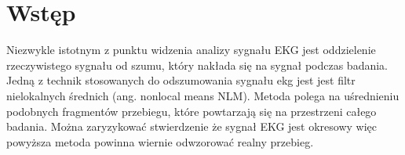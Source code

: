 \section{Wstęp}

Niezwykle istotnym z punktu widzenia analizy sygnału EKG jest oddzielenie rzeczywistego sygnału od szumu, który nakłada się na sygnał podczas badania. Jedną z technik stosowanych do odszumowania sygnału ekg jest jest filtr nielokalnych średnich (ang. nonlocal means NLM). Metoda polega na uśrednieniu podobnych fragmentów przebiegu, które powtarzają się na przestrzeni całego badania. Można zaryzykować stwierdzenie że sygnał EKG jest okresowy więc powyższa metoda powinna wiernie odwzorować realny przebieg. 